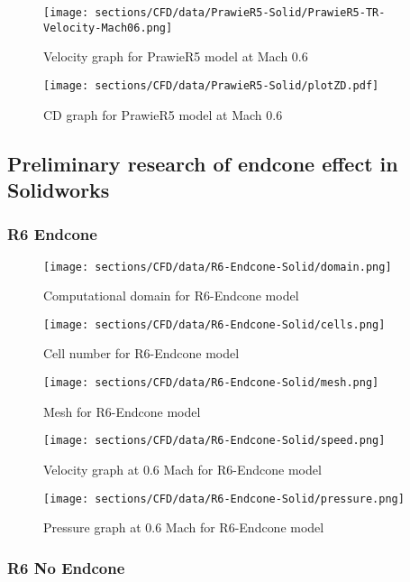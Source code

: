 \begin{figure}[H]
    \centering
    \texttt{[image: sections/CFD/data/PrawieR5-Solid/PrawieR5-TR-Velocity-Mach06.png]}
    \caption{Velocity graph for PrawieR5 model at Mach 0.6}
\end{figure}

\begin{figure}[H]
    \centering
    \texttt{[image: sections/CFD/data/PrawieR5-Solid/plotZD.pdf]}
    \caption{CD graph for PrawieR5 model at Mach 0.6}
\end{figure}



\subsection{Preliminary research of endcone effect in Solidworks}
\subsubsection{R6 Endcone}
\begin{figure}[H]
    \centering
    \texttt{[image: sections/CFD/data/R6-Endcone-Solid/domain.png]}
    \caption{Computational domain for R6-Endcone model}
\end{figure}
\begin{figure}[H]
    \centering
    \texttt{[image: sections/CFD/data/R6-Endcone-Solid/cells.png]}
    \caption{Cell number for R6-Endcone model}
\end{figure}

\begin{figure}[H]
    \centering
    \texttt{[image: sections/CFD/data/R6-Endcone-Solid/mesh.png]}
    \caption{Mesh for R6-Endcone model}
\end{figure}
\begin{figure}[H]
    \centering
    \texttt{[image: sections/CFD/data/R6-Endcone-Solid/speed.png]}
    \caption{Velocity graph at 0.6 Mach for R6-Endcone model}
\end{figure}

\begin{figure}[H]
    \centering
    \texttt{[image: sections/CFD/data/R6-Endcone-Solid/pressure.png]}
    \caption{Pressure graph at 0.6 Mach for R6-Endcone model}
\end{figure}

\subsubsection{R6 No Endcone}

